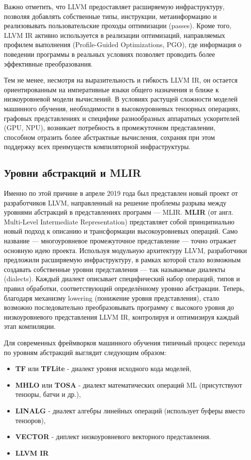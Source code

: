 Важно отметить, что LLVM предоставляет расширяемую инфраструктуру, позволяя добавлять собственные типы, инструкции, метаинформацию и реализовывать пользовательские проходы оптимизации (passes).
Кроме того, LLVM IR активно используется в реализации оптимизаций, направляемых профилем выполнения (Profile-Guided Optimizations, PGO), где информация о поведении программы в реальных условиях позволяет проводить более эффективные преобразования.

Тем не менее, несмотря на выразительность и гибкость LLVM IR, он остается ориентированным на императивные языки общего назначения и ближе к низкоуровневой модели вычислений.
В условиях растущей сложности моделей машинного обучения, необходимости в высокоуровневых тензорных операциях, графовых представлениях и специфике разнообразных аппаратных ускорителей (GPU, NPU), возникает потребность в промежуточном представлении, способном отразить более абстрактные вычисления, сохраняя при этом поддержку всех преимуществ компиляторной инфраструктуры.

\subsection{Уровни абстракций и MLIR}

Именно по этой причине в апреле 2019 года был представлен новый проект от разработчиков LLVM, направленный на решение проблемы разрыва между уровнями абстракций в представлениях программ — MLIR.
\textbf{MLIR} (от англ. Multi-Level Intermediate Representation) \cite{mlir_main} представляет собой принципиально новый подход к описанию и трансформации высокоуровневых операций.
Само название — многоуровневое промежуточное представление — точно отражает основную идею проекта.
Используя модульную архитектуру LLVM, разработчики предложили расширяемую инфраструктуру, в рамках которой стало возможным создавать собственные уровни представления — так называемые диалекты (dialects).
Каждый диалект описывает специфический набор операций, типов и правил обработки, соответствующий определённому уровню абстракции.
Теперь, благодаря механизму lowering (понижение уровня представления), стало возможно последовательно преобразовывать программу с высокого уровня до низкоуровневого представления LLVM IR, контролируя и оптимизируя каждый этап компиляции.

Для современных фреймворков машинного обучения типичный процесс перехода по уровням абстракций выглядит следующим образом:
\begin{itemize}
    \item \textbf{TF} или \textbf{TFLite} - диалект уровня исходного кода моделей,
    \item \textbf{MHLO} или \textbf{TOSA} - диалект математических операций ML (присутствуют тензоры, батчи и др.),
    \item \textbf{LINALG} - диалект алгебры линейных операций (использует буферы вместо тензоров),
    \item \textbf{VECTOR} - диплект низкоуровневого векторного представления.
    \item \textbf{LLVM IR}
\end{itemize}


